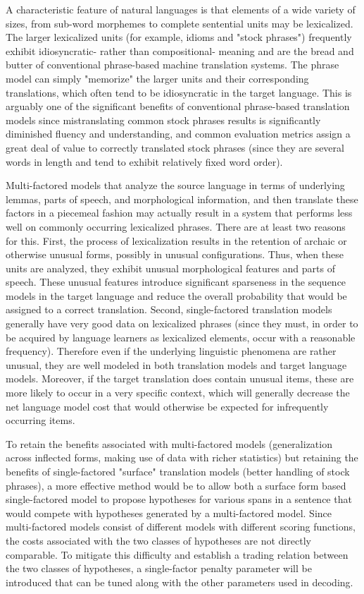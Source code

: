 \documentclass[11pt]{report}
\theoremstyle{plain}
\begin{document}
A characteristic feature of natural languages is that elements of a
wide variety of sizes, from sub-word morphemes to complete
sentential units may be lexicalized.  The larger lexicalized units
(for example, idioms and "stock phrases") frequently exhibit
idiosyncratic- rather than compositional- meaning and are the bread
and butter of conventional phrase-based machine translation systems.
The phrase model can simply "memorize" the larger units and their
corresponding translations, which often tend to be idiosyncratic in
the target language.  This is arguably one of the significant
benefits of conventional phrase-based translation models since
mistranslating common stock phrases results is significantly
diminished fluency and understanding, and common evaluation metrics
assign a great deal of value to correctly translated stock phrases
(since they are several words in length and tend to
exhibit relatively fixed word order).

Multi-factored models that analyze the source language in terms of
underlying lemmas, parts of speech, and morphological information,
and then translate these factors in a piecemeal fashion may actually
result in a system that performs less well on commonly occurring
lexicalized phrases. There are at least two reasons for this. First,
the process of lexicalization results in the retention of archaic or
otherwise unusual forms, possibly in unusual configurations.  Thus,
when these units are analyzed, they exhibit unusual morphological
features and parts of speech.  These unusual features introduce
significant sparseness in the sequence models in the target language
and reduce the overall probability that would be assigned to a
correct translation.  Second, single-factored translation models
generally have very good data on lexicalized phrases (since they
must, in order to be acquired by language learners as lexicalized
elements, occur with a reasonable frequency).  Therefore even if the
underlying linguistic phenomena are rather unusual, they are well
modeled in both translation models and target language models.
Moreover, if the target translation does contain unusual items,
these are more likely to occur in a very specific context, which
will generally decrease the net language model cost that would
otherwise be expected for infrequently occurring items.

To retain the benefits associated with multi-factored models
(generalization across inflected forms, making use of data with
richer statistics) but retaining the benefits of single-factored
"surface" translation models (better handling of stock phrases), a
more effective method would be to allow both a surface form based
single-factored model to propose hypotheses for various spans in a
sentence that would compete with hypotheses generated by a
multi-factored model.  Since multi-factored models consist of
different models with different scoring functions, the costs
associated with the two classes of hypotheses are not directly
comparable.  To mitigate this difficulty and establish a trading
relation between the two classes of hypotheses, a single-factor
penalty parameter will be introduced that can be tuned along with
the other parameters used in decoding.
\end{document}
